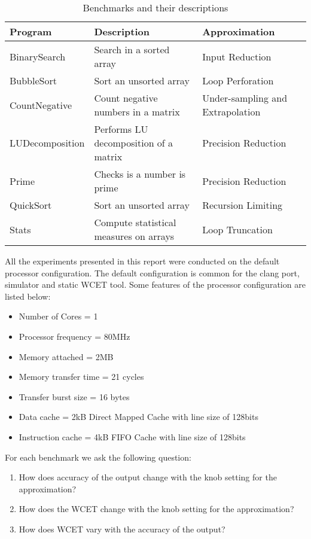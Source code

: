 \begin{table}[]
  \centering
  \caption{Benchmarks and their descriptions}
  \label{description}
  \begin{tabular}{|l|l|l|}
    \hline
    \textbf{Program} & \textbf{Description}                   & \textbf{Approximation}           \\ \hline
    BinarySearch     & Search in a sorted array               & Input Reduction                  \\ \hline
    BubbleSort       & Sort an unsorted array                 & Loop Perforation                 \\ \hline
    CountNegative    & Count negative numbers in a matrix     & Under-sampling and Extrapolation \\ \hline
    LUDecomposition  & Performs LU decomposition of a matrix  & Precision Reduction              \\ \hline
    Prime            & Checks is a number is prime            & Precision Reduction              \\ \hline
    QuickSort        & Sort an unsorted array                 & Recursion Limiting               \\ \hline
    Stats            & Compute statistical measures on arrays & Loop Truncation                  \\ \hline
  \end{tabular}
\end{table}

All the experiments presented in this report were conducted on the default processor configuration. The default configuration is common for the clang port, simulator and static WCET tool. Some features of the processor configuration are listed below:
\begin{itemize}
\item Number of Cores = 1
\item Processor frequency = 80MHz
\item Memory attached = 2MB
\item Memory transfer time = 21 cycles
\item Transfer burst size = 16 bytes
\item Data cache = 2kB Direct Mapped Cache with line size of 128bits
\item Instruction cache = 4kB FIFO Cache with line size of 128bits
\end{itemize}

For each benchmark we ask the following question:
\begin{enumerate}
\item How does accuracy of the output change with the knob setting for the approximation?
\item How does the WCET change with the knob setting for the approximation?
\item How does WCET vary with the accuracy of the output?
\end{enumerate}

